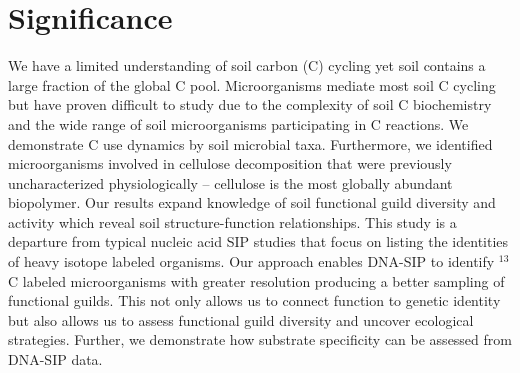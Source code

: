 \section{Significance} We have a limited understanding of soil carbon (C)
cycling yet soil contains a large fraction of the global C pool. Microorganisms
mediate most soil C cycling but have proven difficult to study due to the
complexity of soil C biochemistry and the wide range of soil microorganisms
participating in C reactions. We demonstrate C use dynamics by soil microbial
taxa. Furthermore, we identified microorganisms involved in cellulose
decomposition that were previously uncharacterized physiologically -- cellulose
is the most globally abundant biopolymer. Our results expand knowledge of soil
functional guild diversity and activity which reveal soil structure-function
relationships. This study is a departure from typical nucleic acid SIP studies
that focus on listing the identities of heavy isotope labeled organisms. Our
approach enables DNA-SIP to identify $^{13}$C labeled microorganisms with
greater resolution producing a better sampling of functional guilds. This not
only allows us to connect function to genetic identity but also allows us to
assess functional guild diversity and uncover ecological strategies. Further,
we demonstrate how substrate specificity can be assessed from DNA-SIP data. 
